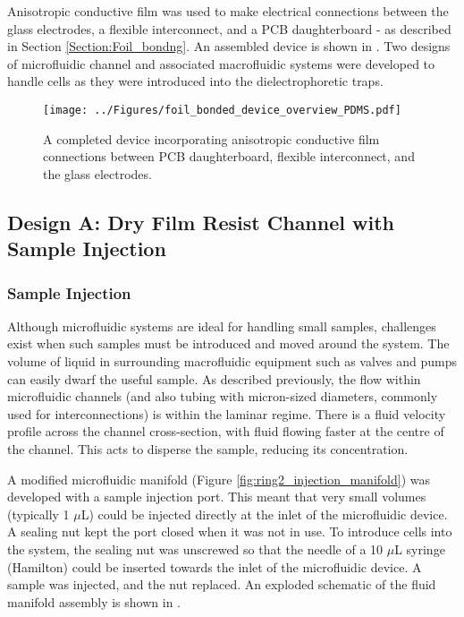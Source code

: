 Anisotropic conductive film was used to make electrical connections between the glass electrodes, a flexible interconnect, and a PCB daughterboard - as described in Section \ref{Section:Foil_bondng}. An assembled device is shown in . Two designs of microfluidic channel and associated macrofluidic systems were developed to handle cells as they were introduced into the dielectrophoretic traps.

\begin{figure}
	\centering
		\texttt{[image: ../Figures/foil\_bonded\_device\_overview\_PDMS.pdf]}
	\caption[A completed device incorporating anisotropic conductive film connections.]{A completed device incorporating anisotropic conductive film connections between PCB daughterboard, flexible interconnect, and the glass electrodes.}
	\label{fig:foil_bonded_device_overview_PDMS}
\end{figure}



\subsection{Design A: Dry Film Resist Channel with Sample Injection}

\subsubsection{Sample Injection}
Although microfluidic systems are ideal for handling small samples, challenges exist when such samples must be introduced and moved around the system. The volume of liquid in surrounding macrofluidic equipment such as valves and pumps can easily dwarf the useful sample. As described previously, the flow within microfluidic channels (and also tubing with micron-sized diameters, commonly used for interconnections) is within the laminar regime. There is a fluid velocity profile across the channel cross-section, with fluid flowing faster at the centre of the channel. This acts to disperse the sample, reducing its concentration.

A modified microfluidic manifold (Figure \ref{fig:ring2_injection_manifold}) was developed with a sample injection port. This meant that very small volumes (typically 1 $\mu$L) could be injected directly at the inlet of the microfluidic device. A sealing nut kept the port closed when it was not in use. To introduce cells into the system, the sealing nut was unscrewed  so that the needle of a 10 $\mu$L syringe (Hamilton) could be inserted towards the inlet of the microfluidic device. A sample was injected, and the nut replaced. An exploded schematic of the fluid manifold assembly is shown in .

